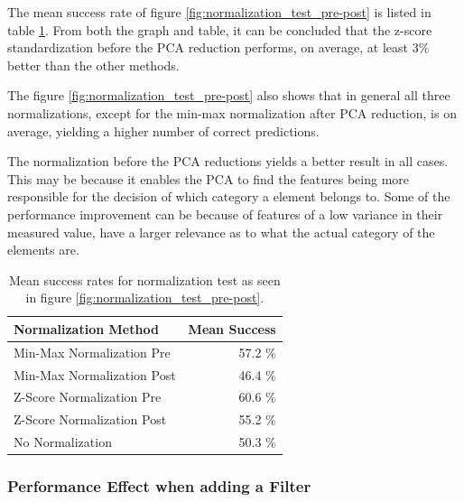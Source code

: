 The mean success rate of figure \ref{fig:normalization_test_pre-post} is listed in table \ref{tab:meanSuccess_normalization_test_pre-post}.
From both the graph and table, it can be concluded that the z-score standardization before the PCA reduction performs, on average, at least 3\% better than the other methods.

The figure \ref{fig:normalization_test_pre-post} also shows that in general all three normalizations, except for the min-max normalization after PCA reduction, is on average, yielding a higher number of correct predictions.

The normalization before the PCA reductions yields a better result in all cases. 
This may be because it enables the PCA to find the features being more responsible for the decision of which category a element belongs to. 
Some of the performance improvement can be because of features of a low variance in their measured value, have a larger relevance as to what the actual category of the elements are.

\begin{table}[H]
\centering
\begin{tabular}{|l|r|}\hline
Normalization Method & Mean Success \\ \hline
Min-Max Normalization Pre & 57.2 \% \\ \hline
Min-Max Normalization Post & 46.4 \% \\ \hline
Z-Score Normalization Pre & 60.6 \% \\ \hline
Z-Score Normalization Post & 55.2  \% \\ \hline
No Normalization & 50.3 \% \\ \hline
\end{tabular}
\caption{Mean success rates for normalization test as seen in figure \ref{fig:normalization_test_pre-post}.}
\label{tab:meanSuccess_normalization_test_pre-post}
\end{table}



\subsubsection{Performance Effect when adding a Filter}

